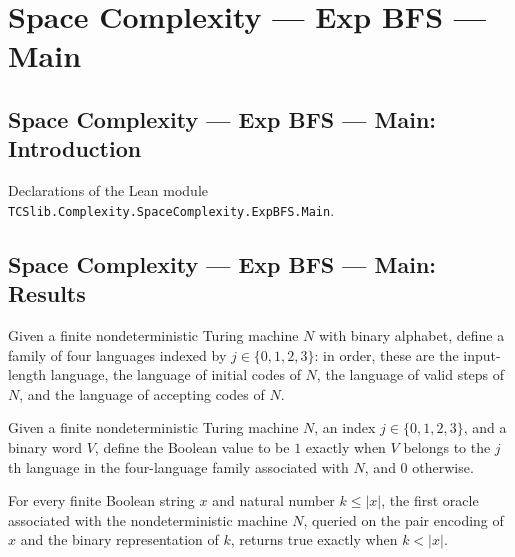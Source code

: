 \section{Space Complexity --- Exp BFS --- Main}
\subsection*{Space Complexity --- Exp BFS --- Main: Introduction}

Declarations of the Lean module \texttt{TCSlib.Complexity.SpaceComplexity.ExpBFS.Main}.

\subsection*{Space Complexity --- Exp BFS --- Main: Results}

\begin{definition}
\label{Complexity.LogProg.ExpBFS.decs}
\leanok
{}
Given a finite nondeterministic Turing machine $N$ with binary alphabet, define a family
of four languages indexed by $j\in\{0,1,2,3\}$: in order, these are the input-length
language, the language of initial codes of $N$, the language of valid steps of $N$, and
the language of accepting codes of $N$.
\end{definition}

\begin{definition}
\label{Complexity.LogProg.ExpBFS.orcN}
\leanok
{}
Given a finite nondeterministic Turing machine $N$, an index $j\in\{0,1,2,3\}$, and a
binary word $V$, define the Boolean value to be $1$ exactly when $V$ belongs to the
$j$th language in the four-language family associated with $N$, and $0$ otherwise.
\end{definition}

\begin{lemma}
\label{Complexity.LogProg.ExpBFS.orcN_len}
\leanok
{}
For every finite Boolean string $x$ and natural number $k\le |x|$, the first oracle
associated with the nondeterministic machine $N$, queried on the pair encoding of $x$
and the binary representation of $k$, returns true exactly when $k<|x|$.
\end{lemma}

